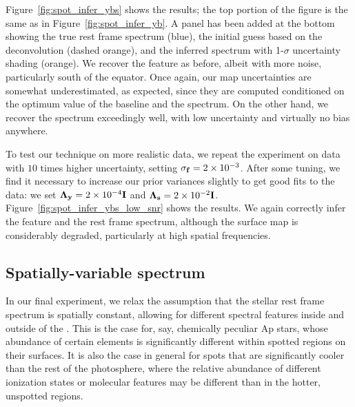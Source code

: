 \documentclass[modern]{aastex631}
\begin{document}
Figure~\ref{fig:spot_infer_ybs} shows the results; the top portion of the figure is the same as in Figure~\ref{fig:spot_infer_yb}.
A panel has been added at the bottom showing the true rest frame spectrum (blue), the initial guess based on the deconvolution (dashed orange), and the inferred spectrum with 1-$\sigma$ uncertainty shading (orange). 
We recover the \spot feature as before, albeit with more noise, particularly south of the equator. 
Once again, our map uncertainties are somewhat underestimated, as expected, since they are computed conditioned on the optimum value of the baseline and the spectrum. 
On the other hand, we recover the spectrum exceedingly well, with low uncertainty and virtually no bias anywhere.

To test our technique on more realistic data, we repeat the experiment on data with $10$ times higher uncertainty, setting $\sigma_{\mathbf{f}} = 2\times 10^{-3}$.
%
After some tuning, we find it necessary to increase our prior variances slightly to get good fits to the data: we set $\boldsymbol{\Lambda}_{\mathbf{y}} = 2\times 10^{-4} {\mathbf{I}}$ and $\boldsymbol{\Lambda}_{\mathbf{s}} = 2\times 10^{-2}{\mathbf{I}}$.
%
Figure~\ref{fig:spot_infer_ybs_low_snr} shows the results.
We again correctly infer the \spot feature and the rest frame spectrum, although the surface map is considerably degraded, particularly at high spatial frequencies.

\subsection{Spatially-variable spectrum}
\label{sec:twospec}
%
In our final experiment, we relax the assumption that the stellar rest frame spectrum is spatially constant, allowing for different spectral features inside and outside of the \spot. 
This is the case for, say, chemically peculiar Ap stars, whose abundance of certain elements is significantly different within spotted regions on their surfaces. 
It is also the case in general for spots that are significantly cooler than the rest of the photosphere, where the relative abundance of different ionization states or molecular features may be different than in the hotter, unspotted regions.
\end{document}
